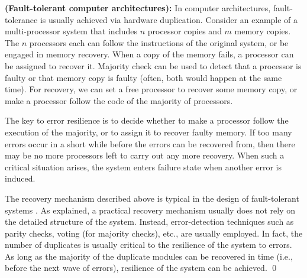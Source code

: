 \begin{example} 
{\bf (Fault-tolerant computer architectures):}  
\label{exmp.avi}
In computer architectures, 
fault-tolerance is usually achieved via hardware duplication.  
Consider an example of a multi-processor system that
includes $n$ processor copies and $m$ memory copies.  
The $n$ processors each can follow the instructions
of the original system, or be engaged in memory recovery. 
When a copy of the memory fails, a processor can be assigned to recover it.
Majority check can be used to detect that a processor is faulty
or that memory copy is faulty\label{reply2.defected} (often, both would happen at the same time). 
For recovery, we can set a free processor to recover some memory copy, or
make a processor follow the code of the majority of processors.

The key to error resilience is to decide whether to make
a processor follow the execution of the majority, or to
assign it to recover faulty memory. 
If too many errors occur in a short while before 
the errors can be recovered from, 
then there may be no more processors left to carry out any more recovery. 
When such a critical situation arises, the system enters failure state when another error is induced.  

The recovery mechanism described\label{reply2.in.the.above} above is typical in 
the design of fault-tolerant systems \cite{Pradhan96}.  
As explained, a practical recovery mechanism usually 
does not rely on the detailed structure of the system.  
Instead, error-detection 
techniques such as parity checks, voting (for majority checks), 
etc., are usually employed.  
In fact, the number of duplicates is usually\label{reply2.usually.is} critical to the 
resilience of the system to errors. 
As long as the majority of the duplicate modules can be recovered 
in time (i.e., before the\label{reply2.the.next} next wave of errors), 
resilience of the system can be achieved. 
\qed 
\end{example} 

